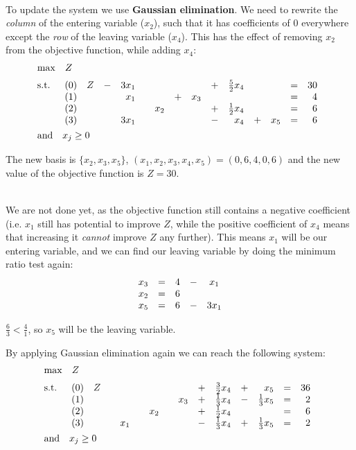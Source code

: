 \documentclass[12pt]{article}
\begin{document}
\noindent
\\
To update the system we use \textbf{Gaussian elimination}.
We need to rewrite the \textit{column} of the entering variable ($x_2$), such that it has coefficients of 0 everywhere except the \textit{row} of the leaving variable ($x_4$).
This has the effect of removing $x_2$ from the objective function, while adding $x_4$:
\begin{align*}
    &\mathrm{max} \quad Z \\[2pt]
    &\mathrm{s.t.} \quad 
    \begin{array}[t]{c r c r c r c r c r c r c r}
        (0) & Z & - & 3x_1 & & & & & + & \frac{5}{2}x_4 & & & = & 30 \\
        (1) & & & x_1 & & & + & x_3 & & & & & = & 4 \\
        (2) & & & & & x_2 & & & + & \frac{1}{2}x_4 & & & = & 6 \\
        (3) & & & 3x_1 & & & & & - & x_4 & + & x_5 & = & 6
    \end{array}\\
    &\mathrm{and} \quad x_j \geq 0
\end{align*}

\noindent
The new basis is $\{ x_2, x_3, x_5 \}$, $(x_1, x_2, x_3, x_4, x_5) = (0, 6, 4, 0, 6)$ and the new value of the objective function is $Z = 30$.

\noindent
\\
We are not done yet, as the objective function still contains a negative coefficient (i.e. $x_1$ still has potential to improve $Z$, while the positive coefficient of $x_4$ means that increasing it \textit{cannot} improve $Z$ any further).
This means $x_1$ will be our entering variable, and we can find our leaving variable by doing the minimum ratio test again:
\begin{align*}
    \begin{array}[t]{c r c r c}
        x_3 & = & 4 & - & x_1 \\
        x_2 & = & 6 & & \\
        x_5 & = & 6 & - & 3x_1
    \end{array}
\end{align*}

\noindent
$\frac{6}{3} < \frac{4}{1}$, so $x_5$ will be the leaving variable.

\newpage
\noindent
By applying Gaussian elimination again we can reach the following system:
\begin{align*}
    &\mathrm{max} \quad Z \\[2pt]
    &\mathrm{s.t.} \quad 
    \begin{array}[t]{c r c r c r c r c r c r c r}
        (0) & Z & & & & & & & + & \frac{3}{2}x_4 & + & x_5 & = & 36 \\
        (1) & & & & & & & x_3 & + & \frac{1}{3}x_4 & - & \frac{1}{3}x_5 & = & 2 \\
        (2) & & & & & x_2 & & & + & \frac{1}{2}x_4 & & & = & 6 \\
        (3) & & & x_1 & & & & & - & \frac{1}{3}x_4 & + & \frac{1}{3}x_5 & = & 2
    \end{array}\\
    &\mathrm{and} \quad x_j \geq 0
\end{align*}
\end{document}

